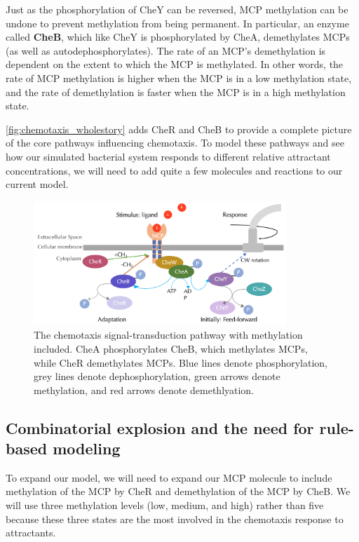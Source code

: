 Just as the phosphorylation of CheY can be reversed, MCP methylation can be undone to prevent methylation from being permanent. In particular, an enzyme called \textbf{CheB}, which like CheY is phosphorylated by CheA, demethylates MCPs (as well as autodephosphorylates). The rate of an MCP's demethylation is dependent on the extent to which the MCP is methylated. In other words, the rate of MCP methylation is higher when the MCP is in a low methylation state, and the rate of demethylation is faster when the MCP is in a high methylation state.

\autoref{fig:chemotaxis_wholestory} adds CheR and CheB to provide a complete picture of the core pathways influencing chemotaxis. To model these pathways and see how our simulated bacterial system responds to different relative attractant concentrations, we will need to add quite a few molecules and reactions to our current model.\\

\begin{figure}[h]
\centering
\mySfFamily
\includegraphics[width = 0.85\textwidth]{../images/chemotaxis_wholestory.png}
\caption{The chemotaxis signal-transduction pathway with methylation included. CheA phosphorylates CheB, which methylates MCPs, while CheR demethylates MCPs. Blue lines denote phosphorylation, grey lines denote dephosphorylation, green arrows denote methylation, and red arrows denote demethlyation.}
\label{fig:chemotaxis_wholestory}
\end{figure}


\FloatBarrier
{}
\subsection{Combinatorial explosion and the need for rule-based modeling}

To expand our model, we will need to expand our MCP molecule to include methylation of the MCP by CheR and demethylation of the MCP by CheB. We will use three methylation levels (low, medium, and high) rather than five because these three states are the most involved in the chemotaxis response to attractants.

